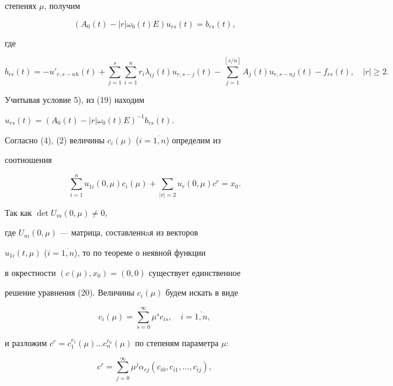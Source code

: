 степенях $\mu$, получим


\begin{equation}


(A_{0}(t)-|r|\omega_{0}(t)E)u_{rs}(t)=b_{rs}(t),


\end{equation}


где


$$


b_{rs}(t)=-u'_{r,s-nh}


(t)+\sum_{j=1}^{s}\sum_{i=1}^{n}r_{i}\lambda_{ij}(t)u_{r,s-j}(t)-


\sum_{j=1}^{[{s}/{n}]}A_{j}(t)u_{r,s-nj}(t)-


f_{rs}(t),\quad |r| \geq 2.


$$


Учитывая условие 5), из (19) находим


$u_{rs}(t)=(A_{0}(t)-|r|\omega_{0}(t)E)^{-1}b_{rs}(t)$.





Согласно (4), (2) величины $c_{i}(\mu)$ ($i=\overline{1,n}$) определим из


соотношения


\begin{equation}


\sum_{i=1}^{n}u_{1i}(0,\mu)c_{i}(\mu)+\sum_{|r|=2}u_{r}(0,\mu)c^{r}=x_{0}.


\end{equation}


Так как $\det U_{m}(0,\mu)\neq 0$,


где $U_{m}(0,\mu)$ --- матрица, составленнaя из векторов


$u_{1i}(t,\mu)$ ($i=\overline{1,n}$), то по теореме о неявной функции


в окрестности $(c(\mu),x_0)=(0,0)$ существует единственное


решение уравнения (20). Величины $c_{i}(\mu)$ будем искать в виде


$$


c_{i}(\mu)=\sum_{s=0}^{\infty}\mu^{s}c_{is},\quad i=\overline{1,n},


$$


и разложим $c^{r}=c_{1}^{r_1}(\mu)\dotsc


c_{n}^{r_n}(\mu)$ по степеням параметра $\mu$:


\begin{equation}


c^{r}=\sum_{j=0}^{\infty}\mu^{j}\alpha_{rj}


(c_{i0},c_{i1},\dotsc, c_{ij}),


\end{equation} 


